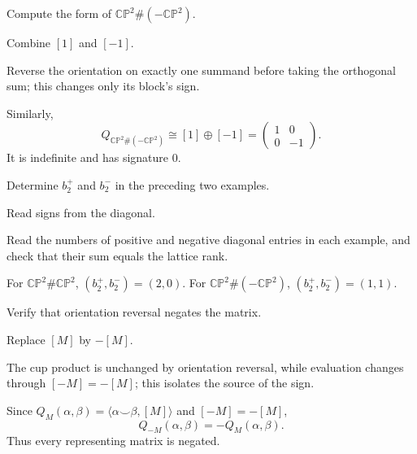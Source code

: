 \begin{exercise}\label{exr:viii34-10}
Compute the form of $\mathbb{CP}^2\#(-\mathbb{CP}^2)$.
\end{exercise}
\begin{hint}
Combine $[1]$ and $[-1]$.

Reverse the orientation on exactly one summand before taking the orthogonal sum; this changes only its block's sign.
\end{hint}
\begin{solution}
Similarly,
\[
Q_{\mathbb{CP}^2\#(-\mathbb{CP}^2)}
\cong[1]\oplus[-1]
=\begin{pmatrix}1&0\\0&-1\end{pmatrix}.
\]
It is indefinite and has signature \(0\).
\end{solution}

\begin{exercise}\label{exr:viii34-11}
Determine $b_2^+$ and $b_2^-$ in the preceding two examples.
\end{exercise}
\begin{hint}
Read signs from the diagonal.

Read the numbers of positive and negative diagonal entries in each example, and check that their sum equals the lattice rank.
\end{hint}
\begin{solution}
For \(\mathbb{CP}^2\#\mathbb{CP}^2\), \((b_2^+,b_2^-)=(2,0)\). For \(\mathbb{CP}^2\#(-\mathbb{CP}^2)\), \((b_2^+,b_2^-)=(1,1)\).
\end{solution}

\begin{exercise}\label{exr:viii34-12}
Verify that orientation reversal negates the matrix.
\end{exercise}
\begin{hint}
Replace $[M]$ by $-[M]$.

The cup product is unchanged by orientation reversal, while evaluation changes through \([-M]=-[M]\); this isolates the source of the sign.
\end{hint}
\begin{solution}
Since \(Q_M(\alpha,\beta)=\langle\alpha\smile\beta,[M]\rangle\) and \([-M]=-[M]\),
\[
Q_{-M}(\alpha,\beta)=-Q_M(\alpha,\beta).
\]
Thus every representing matrix is negated.
\end{solution}

